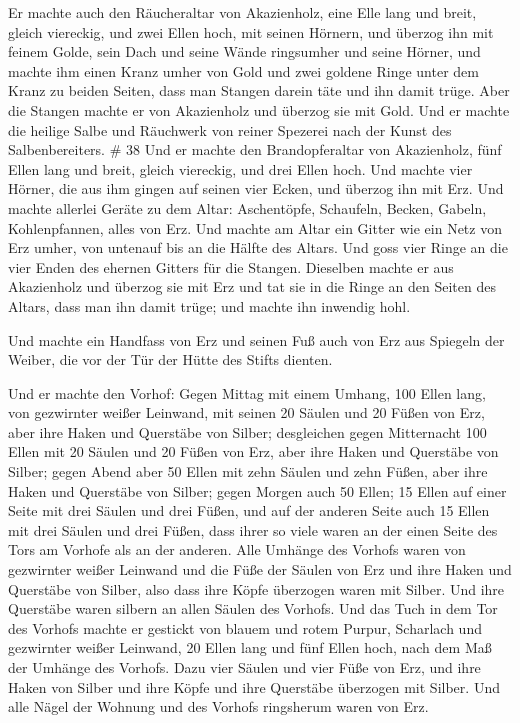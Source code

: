  Er machte auch den Räucheraltar von Akazienholz, eine Elle
lang und breit, gleich viereckig, und zwei Ellen hoch, mit seinen
Hörnern,  und überzog ihn mit feinem Golde, sein Dach und
seine Wände ringsumher und seine Hörner, und machte ihm einen Kranz
umher von Gold  und zwei goldene Ringe unter dem Kranz zu
beiden Seiten, dass man Stangen darein täte und ihn damit trüge.
 Aber die Stangen machte er von Akazienholz und überzog sie
mit Gold.  Und er machte die heilige Salbe und Räuchwerk
von reiner Spezerei nach der Kunst des Salbenbereiters. \# 38
 Und er machte den Brandopferaltar von Akazienholz, fünf
Ellen lang und breit, gleich viereckig, und drei Ellen hoch.
 Und machte vier Hörner, die aus ihm gingen auf seinen vier
Ecken, und überzog ihn mit Erz.  Und machte allerlei Geräte
zu dem Altar: Aschentöpfe, Schaufeln, Becken, Gabeln, Kohlenpfannen,
alles von Erz.  Und machte am Altar ein Gitter wie ein Netz
von Erz umher, von untenauf bis an die Hälfte des Altars. 
Und goss vier Ringe an die vier Enden des ehernen Gitters für die
Stangen.  Dieselben machte er aus Akazienholz und überzog
sie mit Erz  und tat sie in die Ringe an den Seiten des
Altars, dass man ihn damit trüge; und machte ihn inwendig hohl.

 Und machte ein Handfass von Erz und seinen Fuß auch von Erz
aus Spiegeln der Weiber, die vor der Tür der Hütte des Stifts dienten.

 Und er machte den Vorhof: Gegen Mittag mit einem Umhang,
100 Ellen lang, von gezwirnter weißer Leinwand,  mit seinen
20 Säulen und 20 Füßen von Erz, aber ihre Haken und Querstäbe von
Silber;  desgleichen gegen Mitternacht 100 Ellen mit 20
Säulen und 20 Füßen von Erz, aber ihre Haken und Querstäbe von Silber;
 gegen Abend aber 50 Ellen mit zehn Säulen und zehn Füßen,
aber ihre Haken und Querstäbe von Silber;  gegen Morgen
auch 50 Ellen;  15 Ellen auf einer Seite mit drei Säulen
und drei Füßen,  und auf der anderen Seite auch 15 Ellen
mit drei Säulen und drei Füßen, dass ihrer so viele waren an der einen
Seite des Tors am Vorhofe als an der anderen.  Alle Umhänge
des Vorhofs waren von gezwirnter weißer Leinwand  und die
Füße der Säulen von Erz und ihre Haken und Querstäbe von Silber, also
dass ihre Köpfe überzogen waren mit Silber. Und ihre Querstäbe waren
silbern an allen Säulen des Vorhofs.  Und das Tuch in dem
Tor des Vorhofs machte er gestickt von blauem und rotem Purpur,
Scharlach und gezwirnter weißer Leinwand, 20 Ellen lang und fünf Ellen
hoch, nach dem Maß der Umhänge des Vorhofs.  Dazu vier
Säulen und vier Füße von Erz, und ihre Haken von Silber und ihre Köpfe
und ihre Querstäbe überzogen mit Silber.  Und alle Nägel
der Wohnung und des Vorhofs ringsherum waren von Erz.

